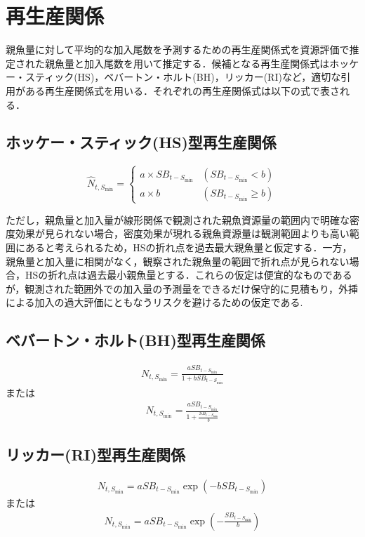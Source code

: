 \documentclass[11pt]{jsarticle}
\begin{document}
\section{再生産関係}
親魚量に対して平均的な加入尾数を予測するための再生産関係式を資源評価で推定された親魚量と加入尾数を用いて推定する．候補となる再生産関係式はホッケー・スティック(HS)\cite{hockey}，ベバートン・ホルト(BH)\cite{beverton}，リッカー(RI)\cite{ricker}など，適切な引用がある再生産関係式を用いる．それぞれの再生産関係式は以下の式で表される．

\subsection{ホッケー・スティック(HS)型再生産関係}


\begin{equation}
  \hat{N}_{t,S_{\mathrm{min}}} = \begin{cases}
    a \times SB_{t-S_{\mathrm{min}}} & (SB_{t-S_{\mathrm{min}}} < b) \\
    a \times b                 & (SB_{t-S_{\mathrm{min}}} \geq b)
  \end{cases}
  \label{HS}
\end{equation}

ただし，親魚量と加入量が線形関係で観測された親魚資源量の範囲内で明確な密度効果が見られない場合，密度効果が現れる親魚資源量は観測範囲よりも高い範囲にあると考えられるため，HSの折れ点を過去最大親魚量と仮定する．一方，親魚量と加入量に相関がなく，観察された親魚量の範囲で折れ点が見られない場合，HSの折れ点は過去最小親魚量とする．これらの仮定は便宜的なものであるが，観測された範囲外での加入量の予測量をできるだけ保守的に見積もり，外挿による加入の過大評価にともなうリスクを避けるための仮定である.

\subsection{ベバートン・ホルト(BH)型再生産関係}

\begin{eqnarray}
  N_{t,S_{\mathrm{min}}}=\frac{a SB_{t-S_{\mathrm{min}}}}{1 + b SB_{t-S_{\mathrm{min}}}}
  \label{BH1}
\end{eqnarray}
または
\begin{eqnarray}
  N_{t,S_{\mathrm{min}}}=\frac{a SB_{t-S_{\mathrm{min}}}}{1 + \frac{SB_{t-S_{\mathrm{min}}}}{b}}
  \label{BH2}
\end{eqnarray}

\subsection{リッカー(RI)型再生産関係}
\begin{eqnarray}
  N_{t,S_{\mathrm{min}}}= a SB_{t-S_{\mathrm{min}}}   \exp{(-b SB_{t-S_{\mathrm{min}}})}
  \label{RI1}
\end{eqnarray}
または
\begin{eqnarray}
  N_{t,S_{\mathrm{min}}}= a SB_{t-S_{\mathrm{min}}}   \exp{(-\frac{SB_{t-S_{\mathrm{min}}}}{b})}
  \label{RI2}
\end{eqnarray}
\end{document}
